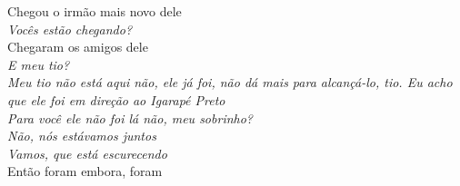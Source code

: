 \begin{linenumbers}\begingroup\raggedright
 
\noindent   Chegou o irmão mais novo dele\\
  \emph{Vocês estão chegando?}\\
  Chegaram os amigos dele\\
  \emph{E meu tio?}\\
  \emph{Meu tio não está aqui não, ele já foi, não dá mais para alcançá-lo, tio. Eu acho que ele foi em direção ao Igarapé Preto}\\
  \emph{Para você ele não foi lá não, meu sobrinho?}\\
  \emph{Não, nós estávamos juntos}\\
  \emph{Vamos, que está escurecendo}\\
  Então foram embora, foram
 
\end{linenumbers}\endgroup

\bigskip

